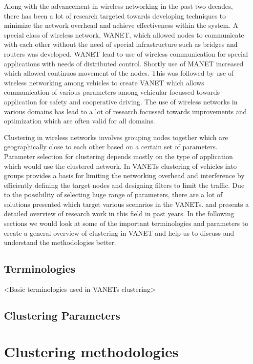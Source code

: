 \documentclass[]{ccs-thesis}
\begin{document}
Along with the advancement in wireless networking in the past two decades, there has been a lot of research targeted
towards developing techniques to minimize the network overhead and achieve effectiveness within the system. A special
class of wireless network, \ac{WANET},  which allowed nodes to communicate with each other without the need of
special infrastructure such as bridges and routers was developed. \ac{WANET} lead to use of wireless communication
for special applications with needs of distributed control. Shortly use of \ac{MANET} increased which allowed
continuos movement of the nodes. This was followed by use of wireless networking among vehicles to create \ac{VANET}
which allows communication of various parameters among vehicular focussed towards application for safety and cooperative
driving. The use of wireless networks in various domains has lead to a lot of research focussed towards improvements
and optimization which are often valid for all domains.

Clustering in wireless networks involves grouping nodes together which are geographically close to each other based on a
certain set of parameters. Parameter selection for clustering depends mostly on the type of application which would use
the clustered network. In \ac{VANET}s clustering of vehicles into groups provides a basis for limiting the networking
overhead and interference by efficiently defining the target nodes and designing filters to limit the traffic. Due to
the possibility of selecting huge range of parameters, there are a lot of solutions presented which target various
scenarios in the \ac{VANET}s. \cite{6256251} and \cite{BALI2014134} presents a detailed overview of research work in this
field in past years. In the following sections we would look at some of the important terminologies and parameters to create
a general overview of clustering in \ac{VANET} and help us to discuss and understand the methodologies better.

\section{Terminologies}

<Basic terminologies used in VANETs clustering>

\section{Clustering Parameters}


\chapter{Clustering methodologies}
\label{sec:methodologies}
\end{document}
